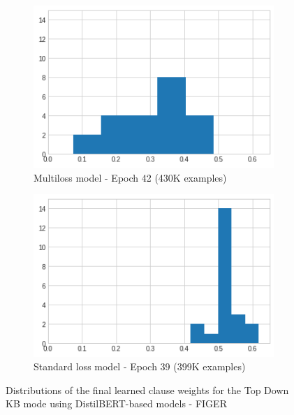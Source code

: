 \begin{figure}[bth]
     \centering
     \begin{subfigure}[b]{0.45\textwidth}
         \centering
         \includegraphics[width=\textwidth]{figures/weight_distrib_distilbert_figer_td_multiloss.png}
         \caption{Multiloss model - Epoch 42 (430K examples)}
         \label{fig:weight_distrib_distilbert_figer_td_multiloss}
     \end{subfigure}
     \hspace{10px}
     \begin{subfigure}[b]{0.45\textwidth}
         \centering
         \includegraphics[width=\textwidth]{figures/weight_distrib_distilbert_figer_td_learnable.png}
         \caption{Standard loss model - Epoch 39 (399K examples)}
         \label{fig:weight_distrib_distilbert_figer_td_learnable}
     \end{subfigure}
    \caption{Distributions of the final learned clause weights for the Top Down KB mode using DistilBERT-based models - FIGER}
    \label{fig:weight_distrib_distilbert_figer_td}
\end{figure}


